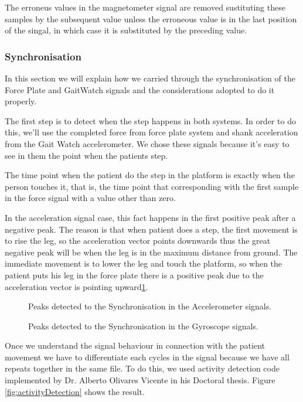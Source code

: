The erroneus values in the magnetometer signal are removed sustituting these samples by the subsequent value unless the erroneous value is in the last position of the singal, in which case it is substituted by the preceding value.

\subsubsection{Synchronisation}	
In this section we will explain how we carried through the synchronisation of the Force Plate and GaitWatch signals and the considerations adopted to do it properly.

The first step is to detect when the step happens in both systems. In order to do this, we’ll use the completed force from force plate system and shank acceleration from the Gait Watch accelerometer. We chose these signals because it’s easy to see in them the point when the patients step.

The time point when the patient do the step in the platform is exactly when the person touches it, that is, the time point that corresponding with the first sample in the force signal with a value other than zero.

In the acceleration signal case, this fact happens in the first positive peak after a negative peak. The reason is that when patient does a step, the first movement is to rise the leg, so the acceleration vector points downwards thus the great negative peak will be when the leg is in the maximum distance from ground. The immediate movement is to lower the leg and touch the platform, so when the patient puts his leg in the force plate there is a positive peak due to the acceleration vector is pointing upward\ref{fig:pointdetectionAcc}.

\begin{figure}[H]
	\centering
	\caption{Peaks detected to the Synchronisation in the Accelerometer signals.}
	\label{fig:pointdetectionAcc}
\end{figure}

\begin{figure}[H]
	\centering
	\caption{Peaks detected to the Synchronisation in the Gyroscope signals.}
	\label{fig:pointdetectionGyro}
\end{figure}


Once we understand the signal behaviour in connection with the patient movement we have to differentiate each cycles in the signal because we have all repeats together in the same file. To do this, we used activity detection code implemented by Dr. Alberto Olivares Vicente in his Doctoral thesis. Figure \ref{fig:activityDetection} shows the result.


